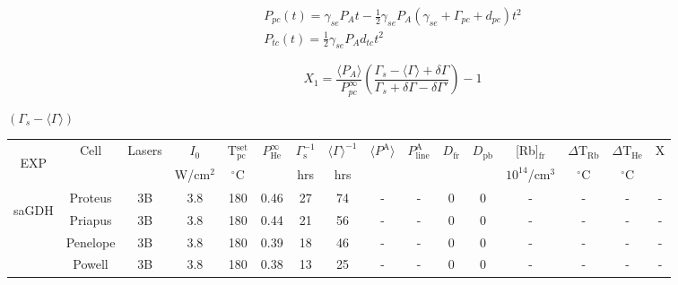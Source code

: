 \documentclass[pdftex,letterpaper,12pt]{report}
\begin{document}
	
\begin{subequations}\label{InitialSpinup}
	\begin{gather}
	P_{pc}(t)=\gamma_{se}P_{A}t-\frac{1}{2}\gamma_{se}P_{A}(\gamma_{se}+\Gamma_{pc}+d_{pc})t^{2}\\
	P_{tc}(t)=\frac{1}{2}\gamma_{se}P_{A}d_{tc}t^{2}
	\end{gather}
\end{subequations}

\begin{equation}
X_1=\frac{\langle P_A\rangle}{P_{pc}^\infty}\left(\frac{\Gamma_s-\langle\Gamma\rangle+\delta\Gamma}{\Gamma_s+\delta\Gamma-\delta\Gamma'}\right)-1
\end{equation}

$(\Gamma_{s}-\langle \Gamma\rangle)$  

\begin{table}\tiny
	\captionsetup{font=scriptsize}
	\begin{center}
		\def\arraystretch{0.75}
		\setlength\tabcolsep{0.5pt}
		\begin{tabular}{|c|c|ccc|ccc|ccccc|cc|c|}
			\hline
			\multirow{2}{*}{\begin{sideways}{EXP}\end{sideways}}&\multirow{2}{*}{Cell} & \multirow{2}{*}{Lasers} & $I_0$ & T$_\mathrm{pc}^\mathrm{set}$ & \multirow{2}{*}{$P_\mathrm{He}^\infty$} & $\Gamma_\mathrm{s}^{-1}$ & $\langle\Gamma\rangle^{-1}$ & \multirow{2}{*}{$\langle P^\mathrm{A} \rangle$} & \multirow{2}{*}{$P_\mathrm{line}^\mathrm{A}$} & \multirow{2}{*}{$D_\mathrm{fr}$} & \multirow{2}{*}{$D_\mathrm{pb}$} & [Rb]$_\mathrm{fr}$ & $\Delta$T$_\mathrm{Rb}$ & $\Delta$T$_\mathrm{He}$ & \multirow{2}{*}{X}\\
			&& & W/cm$^2$ & $^\circ$C & & hrs & hrs & & & & & $10^{14}$/cm$^3$ & $^\circ$C & $^\circ$C &\\
			\hline
			\hline
			\multirow{5}{*}{\begin{sideways}saGDH\end{sideways}} & Proteus & 3B & 3.8 & 180 & 0.46 & 27 & 74 & - & - & 0 & 0 & - & - & - & -\\
			\cline{2-16}
			& Priapus & 3B & 3.8 & 180 & 0.44 & 21 & 56 & - & - & 0 & 0 & - & - & - & -\\
			\cline{2-16}
			& Penelope & 3B & 3.8 & 180 & 0.39 & 18 & 46 & - & - & 0 & 0 & - & - & - & -\\
			\cline{2-16}
			& Powell & 3B & 3.8 & 180 & 0.38 & 13 & 25 & - & - & 0 & 0 & - & - & - & -\\

\end{tabular}
\end{center}
\end{table}
\end{document}
